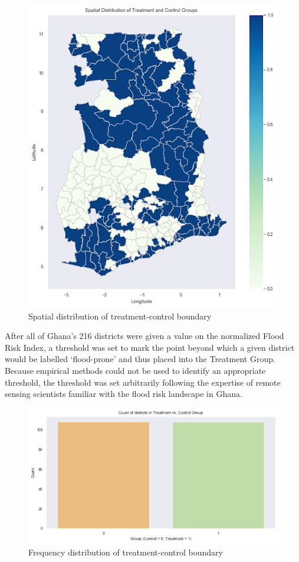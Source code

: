 \begin{figure}
  \begin{center}
    \includegraphics[scale=0.95]{images/03-map.png}
  \end{center}
  \caption{Spatial distribution of treatment-control boundary}
\end{figure}

After all of Ghana’s 216 districts were given a value on the normalized Flood Risk Index, a threshold was set to mark the point beyond which a given district would be labelled ‘flood-prone’ and thus placed into the Treatment Group. Because empirical methods could not be used to identify an appropriate threshold, the threshold was set arbitrarily following the expertise of remote sensing scientists familiar with the flood risk landscape in Ghana.\\

\begin{figure}
  \begin{center}
    \includegraphics[scale=0.7]{images/04-graph.png}
  \end{center}
  \caption{Frequency distribution of treatment-control boundary}
\end{figure}

